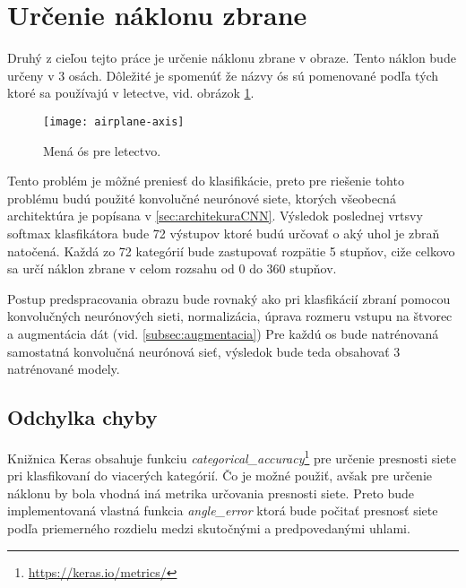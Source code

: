 
\section{Určenie náklonu zbrane}
\label{sec:urcenienaklonuzbrane}
Druhý z cieľou tejto práce je určenie náklonu zbrane v obraze.
Tento náklon bude určeny v 3 osách.
Dôležité je spomenúť že názvy ós sú pomenované podľa tých ktoré sa používajú v letectve, vid. obrázok \ref{pic:airplaneaxis}.
\begin{figure}[H]
    \centering
    \texttt{[image: airplane-axis]}
    \caption{Mená ós pre letectvo.}
    \label{pic:airplaneaxis}
\end{figure}

Tento problém je môžné preniesť do klasifikácie, preto pre riešenie tohto problému budú použité konvolučné neurónové siete, ktorých všeobecná architektúra je popísana v \ref{sec:architekuraCNN}.
Výsledok poslednej vrtsvy softmax klasfikátora bude 72 výstupov ktoré budú určovať o aký uhol je zbraň natočená.
Každá zo 72 kategórií bude zastupovať rozpätie 5 stupňov, ciže celkovo sa určí náklon zbrane v celom rozsahu od 0 do 360 stupňov.

Postup predspracovania obrazu bude rovnaký ako pri klasfikácií zbraní pomocou konvolučných neurónových sieti, normalizácia, úprava rozmeru vstupu na štvorec a augmentácia dát (vid. \ref{subsec:augmentacia})
Pre každú os bude natrénovaná samostatná konvolučná neurónová sieť, výsledok bude teda obsahovať 3 natrénované modely.

\subsection{Odchylka chyby}
\label{subsec:odchylkachyby}
Knižnica Keras obsahuje funkciu \textit{categorical\_accuracy}\footnote{\url{https://keras.io/metrics/}} pre určenie presnosti siete pri klasfikovaní do viacerých kategórií.
Čo je možné použiť, avšak pre určenie náklonu by bola vhodná iná metrika určovania presnosti siete.
Preto bude implementovaná vlastná funkcia \textit{angle\_error} ktorá bude počitať presnosť siete podľa priemerného rozdielu medzi skutočnými a predpovedanými uhlami.
